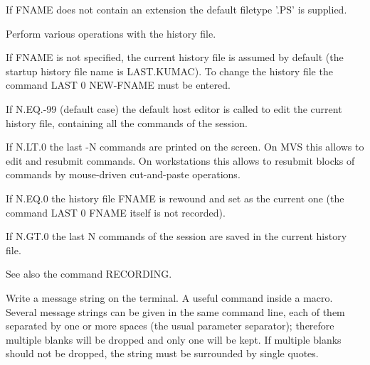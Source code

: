    \par
If FNAME does not contain an extension the default filetype '.PS' is 
   supplied.  

\ENDCMD


\BEGARG
{}
\ENDARG

   \par
Perform various operations with the history file.  

   \par
If FNAME is not specified, the current history file is assumed by default 
   (the startup history file name is LAST.KUMAC).  To change the history file 
   the command LAST 0 NEW-FNAME must be entered.  

   \par
If N.EQ.-99 (default case) the default host editor is called to edit the 
   current history file, containing all the commands of the session.  

   \par
If N.LT.0 the last -N commands are printed on the screen.  On MVS this 
   allows to edit and resubmit commands.  On workstations this allows to 
   resubmit blocks of commands by mouse-driven cut-and-paste operations.  

   \par
If N.EQ.0 the history file FNAME is rewound and set as the current one (the 
   command LAST 0 FNAME itself is not recorded).  

   \par
If N.GT.0 the last N commands of the session are saved in the current 
   history file.  

   \par
See also the command RECORDING.  

\ENDCMD


\BEGARG
{}
\ENDARG

   \par
Write a message string on the terminal.  A useful command inside a macro.  
   Several message strings can be given in the same command line, each of them 
   separated by one or more spaces (the usual parameter separator); therefore 
   multiple blanks will be dropped and only one will be kept.  If multiple 
   blanks should not be dropped, the string must be surrounded by single 
   quotes.  

